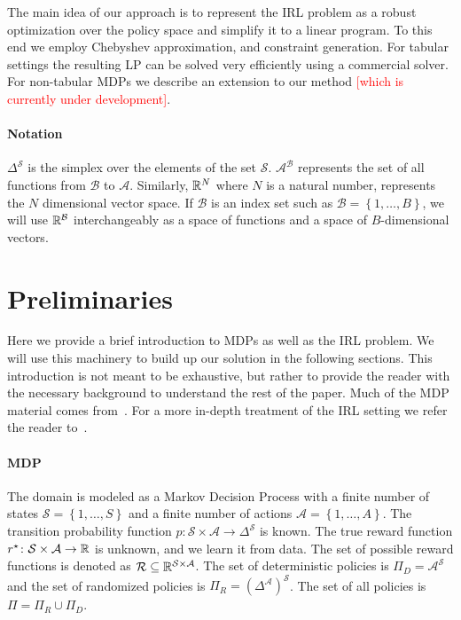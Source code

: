 \documentclass[11pt]{article}
\newcommand{\gersi}[1]{\textcolor{red}{[#1]}}
\begin{document}
The main idea of our approach is to represent the IRL problem as a robust optimization over the policy space and simplify it to a linear program. To this end we employ Chebyshev approximation, and constraint generation. For tabular settings the resulting LP can be solved very efficiently using a commercial solver. For non-tabular MDPs we describe an extension to our method \gersi{which is currently under development}.

\paragraph{Notation} $\Delta^{\mathcal{S}}$ is the simplex over the elements of the set $\mathcal{S}$. $\mathcal{A}^{\mathcal{B}}$ represents the set of all functions from $\mathcal{B}$ to $\mathcal{A}$. Similarly, $\mathbb{R}^N$ where $N$ is a natural number, represents the $N$ dimensional vector space.  If $\mathcal{B}$ is an index set such as $\mathcal{B} = \left\{ 1, \ldots , B \right\}$, we will use $\mathbb{R}^{\mathcal{B}}$ interchangeably as a space of functions and a space of $B$-dimensional
vectors.

\section{Preliminaries}\label{sec:preliminaries}

Here we provide a brief introduction to MDPs as well as the IRL problem. We will use this machinery to build up our solution in the following sections.
This introduction is not meant to be exhaustive, but rather to provide the reader with the necessary background to understand the rest of the paper.
Much of the MDP material comes from~\cite{Puterman1994}. For a more in-depth treatment of the IRL setting we refer the reader to~\cite{abbeel2004}.

\paragraph{MDP}
The domain is modeled as a Markov Decision Process with a finite number of states $\mathcal{S} = \left\{ 1, \dots , S \right\}$ and a finite number of actions $\mathcal{A} = \left\{ 1, \dots , A \right\}$. The transition probability function $p\colon \mathcal{S} \times \mathcal{A} \to \Delta^{\mathcal{S}}$ is known. The true reward function $r^{\mathnormal{\star}} \colon \mathcal{S} \times \mathcal{A} \to \mathbb{R}$ is unknown, and we learn it from data. The set of possible reward functions is denoted as $\mathcal{R} \subseteq \mathbb{R}^{\mathcal{S} \times \mathcal{A}}$. The set of deterministic policies is $\Pi_D= \mathcal{A}^{\mathcal{S}}$ and the set of randomized policies is $\Pi_R = {\left(\Delta^{\mathcal{A}}\right)}^{\mathcal{S}}$. The set of all policies is $\Pi = \Pi_R \cup \Pi_D$.
\end{document}
